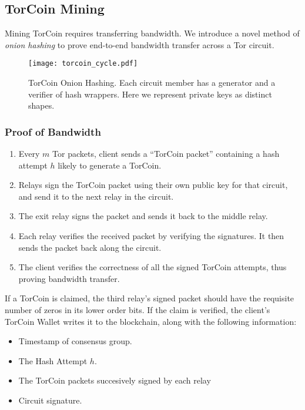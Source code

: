 \subsection{TorCoin Mining}

Mining TorCoin requires transferring bandwidth. We introduce a novel method of
\textit{onion hashing} to prove end-to-end bandwidth transfer across a Tor
circuit.

\begin{figure}[H]
  \centering
    \texttt{[image: torcoin\_cycle.pdf]}
  \caption{TorCoin Onion Hashing. Each circuit member has a generator and a 
  verifier of hash wrappers. Here we represent private keys as distinct shapes.}
\end{figure}

\subsubsection{Proof of Bandwidth}
\begin{enumerate}
\item Every $m$ Tor packets, client sends a ``TorCoin packet'' containing a hash
attempt $h$ likely to generate a TorCoin.
\item Relays sign the TorCoin packet using their own public key for that circuit, 
and send it to the next relay in the circuit.
\item The exit relay signs the packet and sends it back to the middle relay.
\item Each relay verifies the received packet by verifying the signatures. It then sends the packet back along the circuit.
\item The client verifies the correctness of all the signed TorCoin attempts, thus proving
bandwidth transfer.
\end{enumerate}

If a TorCoin is claimed, the third relay's signed packet should have the
requisite number of zeros in its lower order bits. If the claim is verified,
the client's TorCoin Wallet writes it to the blockchain, along with the
following information:

\begin{itemize}
\item Timestamp of consensus group.
\item The Hash Attempt $h$.
\item The TorCoin packets succesively signed by each relay
\item Circuit signature.
\end{itemize}

